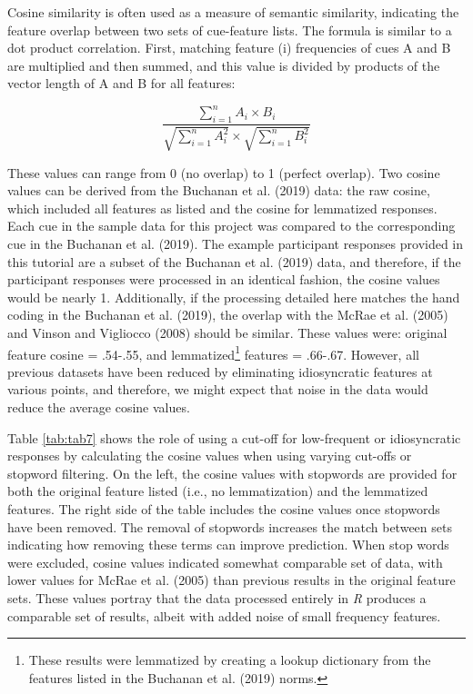 \documentclass[man]{apa6}
\let\rmarkdownfootnote\footnote%
\def\footnote{\protect\rmarkdownfootnote}
\begin{document}
Cosine similarity is often used as a measure of semantic similarity, indicating the feature overlap between two sets of cue-feature lists. The formula is similar to a dot product correlation. First, matching feature (i) frequencies of cues A and B are multiplied and then summed, and this value is divided by products of the vector length of A and B for all features:

\[
\frac{\sum \limits_{i=1}^{n} A_i \times B_i}{\sqrt{\sum \limits_{i=1}^{n} A_i^2}\times\sqrt{\sum \limits_{i=1}^{n}B_i^2}}
\]

These values can range from 0 (no overlap) to 1 (perfect overlap). Two cosine values can be derived from the Buchanan et al. (2019) data: the raw cosine, which included all features as listed and the cosine for lemmatized responses. Each cue in the sample data for this project was compared to the corresponding cue in the Buchanan et al. (2019). The example participant responses provided in this tutorial are a subset of the Buchanan et al. (2019) data, and therefore, if the participant responses were processed in an identical fashion, the cosine values would be nearly 1. Additionally, if the processing detailed here matches the hand coding in the Buchanan et al. (2019), the overlap with the McRae et al. (2005) and Vinson and Vigliocco (2008) should be similar. These values were: original feature cosine = .54-.55, and lemmatized\footnote{These results were lemmatized by creating a lookup dictionary from the features listed in the Buchanan et al. (2019) norms.} features = .66-.67. However, all previous datasets have been reduced by eliminating idiosyncratic features at various points, and therefore, we might expect that noise in the data would reduce the average cosine values.

Table \ref{tab:tab7} shows the role of using a cut-off for low-frequent or idiosyncratic responses by calculating the cosine values when using varying cut-offs or stopword filtering. On the left, the cosine values with stopwords are provided for both the original feature listed (i.e., no lemmatization) and the lemmatized features. The right side of the table includes the cosine values once stopwords have been removed. The removal of stopwords increases the match between sets indicating how removing these terms can improve prediction. When stop words were excluded, cosine values indicated somewhat comparable set of data, with lower values for McRae et al. (2005) than previous results in the original feature sets. These values portray that the data processed entirely in \emph{R} produces a comparable set of results, albeit with added noise of small frequency features.
\end{document}
